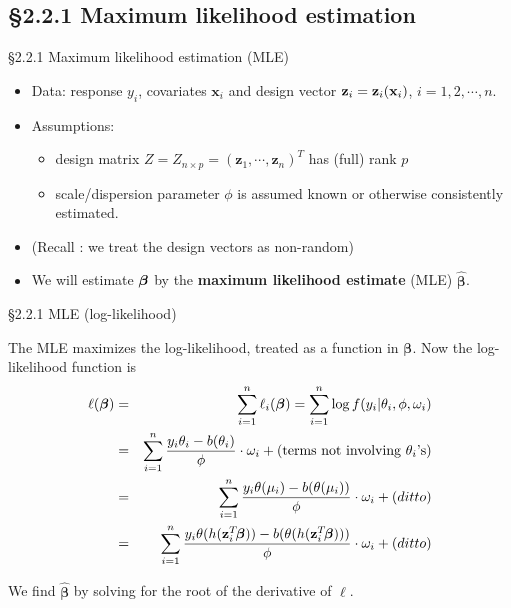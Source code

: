 \documentclass{beamer}
\newcommand{\currentsubsection}{}
\let\oldsubsection\subsection
\renewcommand{\subsection}[1]{\oldsubsection{#1}\renewcommand{\currentsubsection}{#1}}
\newenvironment{wideitemize}%
  {\begin{itemize}%
    \setlength{\parskip}{1em}}%
  {\end{itemize}}
\begin{document}
\subsection{\S2.2.1 Maximum likelihood estimation}\label{sec:2.2.1}
\begin{frame}{\S2.2.1 Maximum likelihood estimation (MLE)}
\begin{wideitemize}
\item
Data:  response $y_i$, covariates $\textbf{x}_i$ and design
vector $\textbf{z}_i = {\bf z}_i(\textbf{x}_i)$, $i=1,2,\cdots, n$.
\item
Assumptions: 
\begin{wideitemize}
\item  design matrix $Z = Z_{n\times p}=(\textbf{z}_1,\cdots,\textbf{z}_n)^T$ has (full) rank $p$
\item  scale/dispersion parameter $\phi$ is
assumed known or otherwise consistently estimated. 
\end{wideitemize}

\item 
(Recall : we treat the design vectors as non-random)

\item We will estimate $\mbox{\boldmath $\beta$}$ by the {\bf maximum likelihood estimate} (MLE) $\hat{\boldsymbol \beta}$. 
\end{wideitemize}

\end{frame}

\begin{frame}{\S2.2.1 MLE (log-likelihood)}

The MLE maximizes the log-likelihood, treated as a function in $\boldsymbol \beta$. Now the log-likelihood function is {\footnotesize
\begin{eqnarray*}
\ell(\mbox{\boldmath $\beta$})&=&\sum_{i=1}^n\ell_i(\mbox{\boldmath $\beta$})
=\sum_{i=1}^n \log f(y_i|\theta_i,\phi,\omega_i) \\
&=&\sum_{i=1}^n \frac{y_i\theta_i-b(\theta_i)}{\phi}\cdot\omega_i
+(\mbox{terms not involving $\theta_i$'s} )\\
&=& \sum_{i=1}^n \frac{y_i\theta (\mu_i)-b(\theta(\mu_i))}{\phi}\cdot\omega_i  + (ditto)\\
&=&\sum_{i=1}^n \frac{y_i\theta (h(\textbf{z}_i^T\!\mbox{\boldmath $\beta$}))-
b(\theta(h(\textbf{z}_i^T\!\mbox{\boldmath $\beta$})))}{\phi}\cdot\omega_i + (ditto)
\end{eqnarray*}}



 We find $\hat{\boldsymbol \beta}$ by solving for the root  of the derivative of $\ell$. 
\end{frame}
\end{document}
